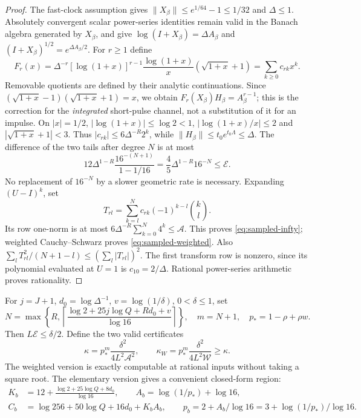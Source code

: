 \begin{proof}
The fast-clock assumption gives $\|X_\beta\|\le e^{1/64}-1\le1/32$
and $\Delta\le1$. Absolutely convergent scalar power-series identities remain
valid in the Banach algebra generated by $X_\beta$, and give
$\log(I+X_\beta)=\Delta A_\beta$ and
$(I+X_\beta)^{1/2}=e^{\Delta A_\beta/2}$. For $r\ge1$ define
\[
 F_r(x)=\Delta^{-r}[\log(1+x)]^{r-1}
       \frac{\log(1+x)}{x}(\sqrt{1+x}+1)=\sum_{k\ge0}c_{rk}x^k.
\]
Removable quotients are defined by their analytic continuations.
Since $(\sqrt{1+x}-1)(\sqrt{1+x}+1)=x$, we obtain
$F_r(X_\beta)H_\beta=A_\beta^{r-1}$; this is the correction for the
\emph{integrated} short-pulse channel, not a substitution of it for an impulse.
On $|x|=1/2$, $|\log(1+x)|\le\log2<1$,
$|\log(1+x)/x|\le2$ and $|\sqrt{1+x}+1|<3$. Thus
$|c_{rk}|\le6\Delta^{-R}2^k$, while
$\|H_\beta\|\le t_0e^{t_0\Lambda}\le\Delta$.
The difference of the two tails after degree $N$ is at most
\begin{equation}
 12\Delta^{1-R}\frac{16^{-(N+1)}}{1-1/16}
 =\frac45\Delta^{1-R}16^{-N}\le\mathcal E.
 \label{eq:sharp-tail}
\end{equation}
No replacement of $16^{-N}$ by a slower geometric rate is necessary.
Expanding $(U-I)^k$, set
\[
 T_{rl}=\sum_{k=l}^N c_{rk}(-1)^{k-l}\binom{k}{l}.
\]
Its row one-norm is at most
$6\Delta^{-R}\sum_{k=0}^N4^k\le\mathcal A$.
This proves \eqref{eq:sampled-infty}; weighted Cauchy--Schwarz proves
\eqref{eq:sampled-weighted}. Also
$\sum_lT_{rl}^2/(N+1-l)\le(\sum_l|T_{rl}|)^2$.
The first transform row is nonzero, since its polynomial evaluated at $U=1$
is $c_{10}=2/\Delta$. Rational power-series arithmetic proves rationality.
\end{proof}

For $j=J+1$, $d_0=\log\Delta^{-1}$, $v=\log(1/\delta)$, $0<\delta\le1$, set
\begin{equation}
 N=\max\left\{R,\left\lceil\frac{\log2+25j\log Q+Rd_0+v}{\log16}
                   \right\rceil\right\},\quad m=N+1,\quad
 p_*=1-\rho+\rho w.
 \label{eq:choose-N}
\end{equation}
Then $L\mathcal E\le\delta/2$. Define the two valid certificates
\begin{equation}
 \kappa=p_*^m\frac{\delta^2}{4L^2\mathcal A^2},\qquad
 \kappa_W=p_*^m\frac{\delta^2}{4L^2\mathcal W}\ge\kappa.
 \label{eq:kappa}
\end{equation}
The weighted version is exactly computable at rational inputs without taking
a square root. The elementary version gives a convenient closed-form region:
\begin{equation}
 \begin{split}
 K_b&=12+\frac{\log2+25\log Q+8d_0}{\log16},\qquad
 A_b=\log(1/p_*)+\log16,\\
 C_b&=\log256+50\log Q+16d_0+K_bA_b,\qquad
 p_b=2+A_b/\log16=3+\log(1/p_*)/\log16.
 \end{split}\label{eq:constants}
\end{equation}

